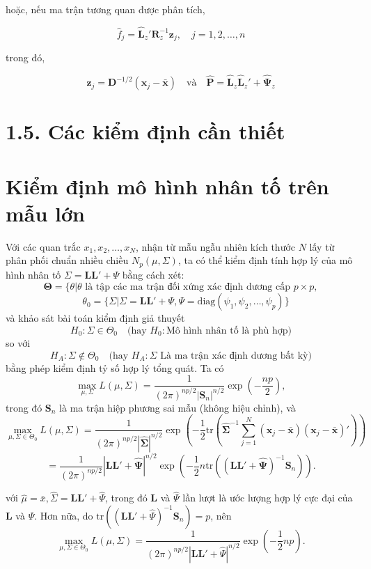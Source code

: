 \documentclass{article}
\begin{document}
hoặc, nếu ma trận tương quan được phân tích,

\[
\hat{f}_j = \hat{\mathbf{L}}_z' \mathbf{R}^{-1}_z \mathbf{z}_j, \quad j = 1,2,\ldots,n
\]

trong đó,

\[
\mathbf{z}_j = \mathbf{D}^{-1/2} (\mathbf{x}_j - \bar{\mathbf{x}}) \quad \text{và} \quad \hat{\mathbf{P}} = \hat{\mathbf{L}}_z \hat{\mathbf{L}}_z' + \hat{\mathbf{\Psi}}_z
\]

\vspace{1cm}

\section* {1.5. Các kiểm định cần thiết}
\vspace{0cm}
\section*{Kiểm định mô hình nhân tố trên mẫu lớn}

Với các quan trắc \( x_1, x_2, \ldots, x_N \), nhận từ mẫu ngẫu nhiên kích thước \( N \) lấy từ phân phối chuẩn nhiều chiều \( N_p(\mu, \Sigma) \), ta có thể kiểm định tính hợp lý của mô hình nhân tố \( \Sigma = \mathbf{LL}' + \Psi \) bằng cách xét:
\[
\mathbf{\Theta} = \{\theta | \theta \text{ là tập các ma trận đối xứng xác định dương cấp } p \times p,
\]
\[
\quad \theta_0 = \{\Sigma | \Sigma = \mathbf{LL}' + \Psi, \Psi = \text{diag}(\psi_1, \psi_2, \ldots, \psi_p)\}
\]
và khảo sát bài toán kiểm định giả thuyết
\[
H_0: \Sigma \in \Theta_0 \quad \text{(hay } H_0: \text{Mô hình nhân tố là phù hợp)}
\]
so với
\[
H_A: \Sigma \notin \Theta_0 \quad \text{(hay } H_A: \Sigma \text{ Là ma trận xác định dương bất kỳ)}
\]
bằng phép kiểm định tỷ số hợp lý tổng quát. Ta có
\[
\max_{\mu, \Sigma} L(\mu, \Sigma) = \frac{1}{(2\pi)^{np/2} |\mathbf{S}_n|^{n/2}} \exp \left( -\frac{np}{2} \right),
\]
trong đó \( \mathbf{S}_n \) là ma trận hiệp phương sai mẫu (không hiệu chỉnh), và
\[
\max_{\mu, \Sigma \in \Theta_0} L(\mu, \Sigma) = \frac{1}{(2\pi)^{np/2} | \mathbf{\hat{\Sigma}} |^{n/2}} \exp \left( -\frac{1}{2} \text{tr} \left( \mathbf{\hat{\Sigma}}^{-1} \sum_{j=1}^N (\mathbf{x}_j - \bar{\mathbf{x}})(\mathbf{x}_j - \bar{\mathbf{x}})' \right) \right)
\]
\[
= \frac{1}{(2\pi)^{np/2}} | \mathbf{L}\mathbf{L}' + \mathbf{\hat{\Psi}} |^{n/2} \exp \left( -\frac{1}{2}n \text{tr} \left( (\mathbf{L}\mathbf{L}' + \mathbf{\hat{\Psi}})^{-1} \mathbf{S}_n \right) \right).
\]

với $\hat{\mu} = \bar{x}, \hat{\Sigma} = \mathbf{LL}' + \hat{\Psi}$, trong đó $\mathbf{L}$ và $\hat{\Psi}$ lần lượt là ước lượng hợp lý cực đại của $\mathbf{L}$ và $\Psi$. Hơn nữa, do $\text{tr} \left( (\mathbf{LL}' + \hat{\Psi})^{-1} \mathbf{S}_n \right) = p$, nên
\[
\max_{\mu, \Sigma \in \Theta_0} L(\mu, \Sigma) = \frac{1}{(2\pi)^{np/2} | \mathbf{LL}' + \hat{\Psi} |^{n/2}} \exp \left( -\frac{1}{2} np \right).
\]
\end{document}
